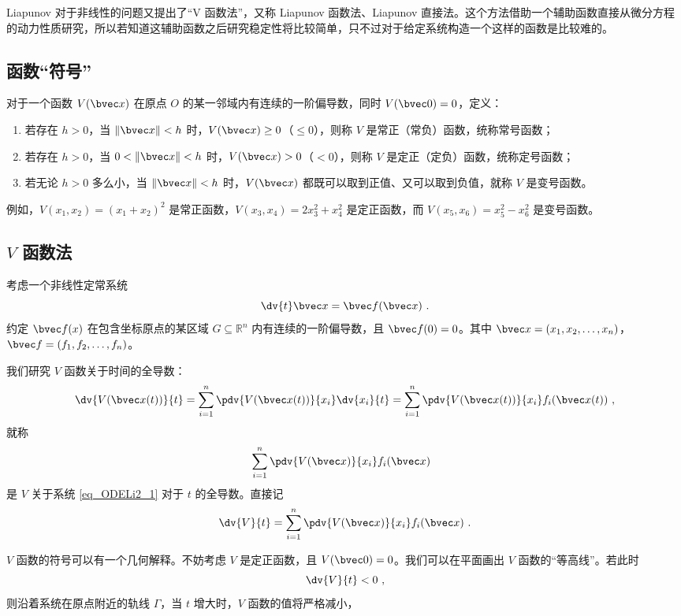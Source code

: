
Liapunov 对于非线性的问题又提出了“V 函数法”，又称 Liapunov 函数法、Liapunov 直接法。这个方法借助一个辅助函数直接从微分方程的动力性质研究，所以若知道这辅助函数之后研究稳定性将比较简单，只不过对于给定系统构造一个这样的函数是比较难的。



\subsection{函数“符号”}
\begin{definition}{}
对于一个函数 $ V(\bvec x)$ 在原点 $O$ 的某一邻域内有连续的一阶偏导数，同时 $ V(\bvec 0 ) = 0$，定义：
\begin{enumerate}
\item 若存在 $h>0$，当 $\Vert \bvec x \Vert < h$ 时，$V(\bvec x) \ge 0$（$\le 0$），则称 $V$ 是常正（常负）函数，统称常号函数；
\item 若存在 $h > 0$，当 $0 < \Vert \bvec x \Vert < h$ 时，$V(\bvec x) > 0$（$< 0$），则称 $V$ 是定正（定负）函数，统称定号函数；
\item 若无论 $h > 0$ 多么小，当 $\Vert \bvec x \Vert < h$ 时，$V(\bvec x)$ 都既可以取到正值、又可以取到负值，就称 $V$ 是变号函数。
\end{enumerate}

\end{definition}

例如，$V(x_1, x_2) = (x_1 + x_2)^2$ 是常正函数，$V(x_3, x_4) = 2 x_3^2 + x_4^2$ 是定正函数，而 $V(x_5, x_6) = x_5^2 - x_6^2$ 是变号函数。

\subsection{$V$ 函数法}
考虑一个非线性定常系统 
\begin{equation}\label{eq_ODELi2_1}
\dv{t} \bvec x = \bvec f(\bvec x) ~.
\end{equation}
约定 $\bvec f(x)$ 在包含坐标原点的某区域 $G \subseteq \mathbb R^n$ 内有连续的一阶偏导数，且 $\bvec f(0) = 0$。其中 $\bvec x = (x_1, x_2, \dots, x_n)$，$\bvec f = (f_1, f_2, \dots, f_n)$。

我们研究 $V$ 函数关于时间的全导数：
\begin{equation}
\dv{V(\bvec x(t))}{t} = \sum_{i=1}^n \pdv{V(\bvec x(t))}{x_i} \dv{x_i}{t} = \sum_{i=1}^n \pdv{V(\bvec x(t))}{x_i} f_i(\bvec x(t)) ~,
\end{equation}
就称 
\begin{equation}
\sum_{i=1}^n \pdv{V(\bvec x)}{x_i} f_i(\bvec x) ~~
\end{equation}
是 $V$ 关于系统 \autoref{eq_ODELi2_1} 对于 $t$ 的全导数。直接记
\begin{equation}
\dv{V}{t} = \sum_{i=1}^n \pdv{V(\bvec x)}{x_i} f_i(\bvec x) ~.
\end{equation}

$V$ 函数的符号可以有一个几何解释。不妨考虑 $V$ 是定正函数，且 $V(\bvec 0) = 0$。我们可以在平面画出 $V$ 函数的“等高线”。若此时 
\begin{equation}
\dv{V}{t} < 0 ~,
\end{equation}
则沿着系统在原点附近的轨线 $\Gamma$，当 $t$ 增大时，$V$ 函数的值将严格减小，

